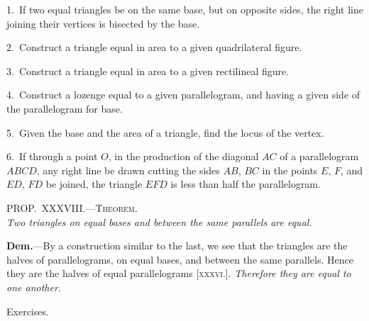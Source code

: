\documentclass[oneside]{book}
\newcommand\myprop[2]{
\bigskip\Needspace*{4\baselineskip}\begin{center}\textsc{#1}\\\medskip\emph{#2}\par\end{center}
}
\newcommand\exhead[1]{
\Needspace*{5\baselineskip}\begin{center}
\textsf{#1}
\end{center}
}
\begin{document}
\begin{footnotesize}
1.~If two equal triangles be on the same base, but on opposite
sides, the right line joining their vertices is bisected by the base.

2.~Construct a triangle equal in area to a given quadrilateral
figure.

3.~Construct a triangle equal in area to a given rectilineal
figure.

4.~Construct a lozenge equal to a given parallelogram, and
having a given side of the parallelogram for base.

5.~Given the base and the area of a triangle, find the locus of
the vertex.

6.~If through a point $O$, in the production of the diagonal $AC$
of a parallelogram $ABCD$, any right line be drawn cutting the
sides $AB$, $BC$ in the points $E$, $F$, and $ED$, $FD$ be joined, the
triangle $EFD$ is less than half the parallelogram.
\par\end{footnotesize}



\myprop{PROP\@.~XXXVIII\@.---Theorem.}{Two triangles on equal bases and between the same
parallels are equal.}

\textbf{Dem.}---By a construction similar to the last, we see
that the triangles are the halves of parallelograms, on
equal bases, and between the same parallels. Hence
they are the halves of equal parallelograms [\textsc{xxxvi}.].
\emph{Therefore they are equal to one another.}

\exhead{Exercises.}
\end{document}

